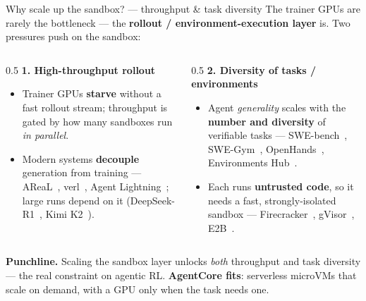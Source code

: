\documentclass[aspectratio=169]{beamer}
\begin{document}
\begin{frame}{Why scale up the sandbox? --- throughput \& task diversity}
  \footnotesize The trainer GPUs are rarely the bottleneck --- the \textbf{rollout /
  environment-execution layer} is. Two pressures push on the sandbox:
  \vspace{0.2em}
  \begin{columns}[T]
    \begin{column}{0.5\textwidth}
      \textbf{1. High-throughput rollout}
      \begin{itemize}\setlength\itemsep{0.15em}
        \item Trainer GPUs \textbf{starve} without a fast rollout stream; throughput is gated by how many
          sandboxes run \emph{in parallel}.
        \item Modern systems \textbf{decouple} generation from training --- AReaL~\cite{areal},
          verl~\cite{verl}, Agent Lightning~\cite{al-paper}; large runs depend on it (DeepSeek-R1~\cite{deepseekr1}, Kimi K2~\cite{kimik2}).
      \end{itemize}
    \end{column}
    \begin{column}{0.5\textwidth}
      \textbf{2. Diversity of tasks / environments}
      \begin{itemize}\setlength\itemsep{0.15em}
        \item Agent \emph{generality} scales with the \textbf{number and diversity} of verifiable tasks
          --- SWE-bench~\cite{swebench}, SWE-Gym~\cite{swegym}, OpenHands~\cite{openhands}, Environments Hub~\cite{envhub}.
        \item Each runs \textbf{untrusted code}, so it needs a fast, strongly-isolated sandbox ---
          Firecracker~\cite{firecracker}, gVisor~\cite{gvisor}, E2B~\cite{e2b}.
      \end{itemize}
    \end{column}
  \end{columns}
  \vspace{0.3em}
  {\scriptsize \textbf{Punchline.} Scaling the sandbox layer unlocks \emph{both} throughput and task
  diversity --- the real constraint on agentic RL. \textbf{AgentCore fits}: serverless microVMs that scale
  on demand, with a GPU only when the task needs one.}
\end{frame}
\end{document}

